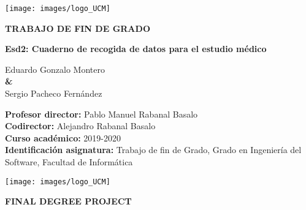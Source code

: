 \documentclass{report}
\begin{document}
    \begin{titlepage}
        \centering
        {\texttt{[image: images/logo\_UCM]}}
    
        \vspace{1cm}
        
        {\huge\textbf{TRABAJO DE FIN DE GRADO \\ }  }

        \vspace{0.5cm}
        
        {\huge\textbf{Esd2: Cuaderno de recogida de datos para el estudio médico}}
        
        \vspace{1.4cm}
    
        {\Large Eduardo Gonzalo Montero \\}
        \vspace{0.5cm}
        {\textbf \&\\}
        \vspace{0.5cm}
        {\Large Sergio Pacheco Fernández \\}
        
        \vspace{1.4cm}
        
        \raggedright
        {\Large \textbf{Profesor director:} Pablo Manuel Rabanal Basalo \\}
        \vspace{0.1cm}
        {\Large \textbf{Codirector:} Alejandro Rabanal Basalo \\}
        \vspace{0.1cm}
        {\Large\textbf {Curso académico:} 2019-2020 \\}
        \vspace{0.1cm}
        {\Large\textbf {Identificación asignatura: }Trabajo de fin de Grado, Grado en Ingeniería del Software, Facultad de Informática \\}
   
        \clearpage
        
        \pagestyle{empty}
 
        \centering
        {\texttt{[image: images/logo\_UCM]}}
    
        \vspace{1cm}
        
        {\huge\textbf{FINAL DEGREE PROJECT \\ }  }

        \vspace{0.5cm}
        

\end{titlepage}
\end{document}
